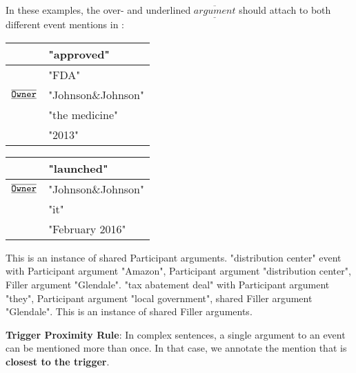 In these examples, the over- and underlined $\overline{\underline{argument}}$ should attach to both different event mentions in :
\begin{samepage}
\begin{exe}
\ex {}
    \nopagebreak
        \expl \begin{tabular}{|L{6cm}|L{7cm}|} \hline
             & "approved" \\\hline
             & "FDA" \\
            $\overline{\underline{\texttt{Owner}}}$ & "Johnson\&Johnson" \\
             & "the medicine" \\
             & "2013" \\
            \hline \end{tabular}
        \expl \begin{tabular}{|L{6cm}|L{7cm}|} \hline
             & "launched" \\\hline
            $\overline{\underline{\texttt{Owner}}}$ & "Johnson\&Johnson" \\
             & "it" \\
             & "February 2016" \\\hline \end{tabular}
        \expl This is an instance of shared Participant arguments.
    \ex  {}
        \expl "distribution center"  event with  Participant argument "Amazon",  Participant argument "distribution center",  Filler argument "Glendale".
        \expl "tax abatement deal"  with  Participant argument "they",  Participant argument "local government", shared  Filler argument "Glendale".
        \expl This is an instance of shared Filler arguments.
\end{exe}
\end{samepage}

\noindent
\textbf{Trigger Proximity Rule}:
In complex sentences, a single argument to an event can be mentioned more than once. 
In that case, we annotate the mention that is \textbf{closest to the trigger}.\\


